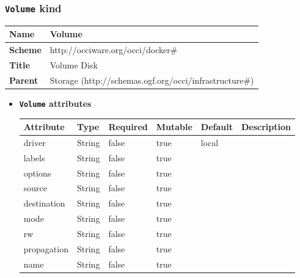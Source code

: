 \subsubsection{\texttt{Volume} kind}
\begin{center}
\begin{tabular}{|l|l|}
  \hline
  \textbf{Name} & Volume \\
  \hline  
  \textbf{Scheme} & http://occiware.org/occi/docker\# \\
  \hline
  \textbf{Title} & Volume Disk \\
  \hline
  \textbf{Parent} & Storage (http://schemas.ogf.org/occi/infrastructure\#) \\
  \hline
\end{tabular}
\end{center}
\begin{itemize}
\item \textbf{\texttt{Volume} attributes}

\begin{tabularx}{\textwidth}{|l|l|p{1.4cm}|p{1.3cm}|l|X|}
  \hline
  \textbf{Attribute} & \textbf{Type} & \textbf{Required} & \textbf{Mutable} & \textbf{Default} & \textbf{Description} \\
  \hline  
  driver & String & false & true & local &  \\
  \hline
  labels & String & false & true &  &  \\
  \hline
  options & String & false & true &  &  \\
  \hline
  source & String & false & true &  &  \\
  \hline
  destination & String & false & true &  &  \\
  \hline
  mode & String & false & true &  &  \\
  \hline
  rw & String & false & true &  &  \\
  \hline
  propagation & String & false & true &  &  \\
  \hline
  name & String & false & true &  &  \\
  \hline
\end{tabularx}
\end{itemize}




